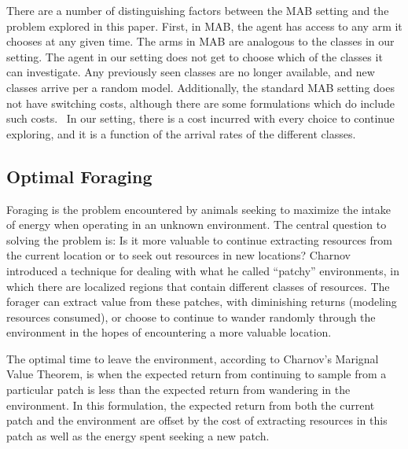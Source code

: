 
There are a number of distinguishing factors between the MAB setting and the problem explored in this paper.  First, in MAB, the agent
has access to any arm it chooses at any given time.  The arms in MAB are
analogous to the classes in our setting.  The agent in our setting does not get
to choose which of the classes it can investigate.  Any previously seen classes
are no longer available, and new classes arrive per a random model.  Additionally,
the standard MAB setting does not have switching costs, although there are some
formulations which do include such costs.~\cite{jun2004survey}  In our setting, there is a cost incurred
with every choice to continue exploring, and it is a function of the arrival
rates of the different classes.

\subsection{Optimal Foraging}

Foraging is the problem encountered by animals seeking to maximize the intake
of energy when operating in an unknown environment.  The central question to
solving the problem is: Is it more valuable to continue extracting resources
from the current location or to seek out resources in new locations?  Charnov~\cite{charnov1976optimal} introduced a technique for dealing with what he called
``patchy'' environments, in which there are localized regions that contain
different classes of resources.  The forager can
extract value from these patches, with diminishing returns (modeling resources consumed), or choose to
continue to wander randomly through the environment in the hopes of
encountering a more valuable location.

The optimal time to leave the environment, according to Charnov's Marignal Value Theorem, is when the expected return from continuing to
sample from a particular patch is less than the expected return from wandering in the
environment.  In this formulation, the expected return from both the current
patch and the environment are offset by the cost of extracting resources in
this patch as well as the energy spent seeking a new patch.

